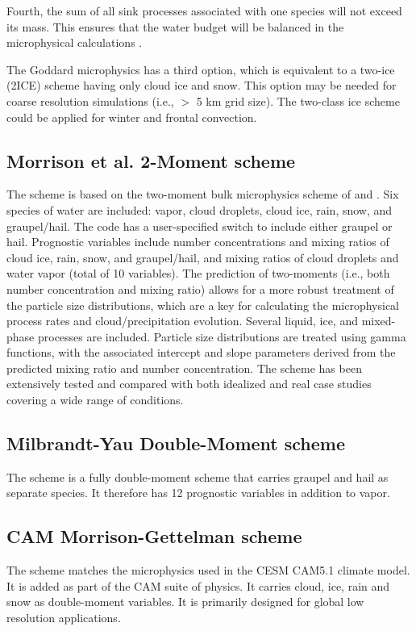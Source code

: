 Fourth, the sum of all sink processes associated with one species will not exceed its mass.  This ensures that the water budget will be balanced in the microphysical calculations .

The Goddard microphysics has a third option, which is equivalent to a two-ice (2ICE) scheme having only cloud ice and snow.  This option may be needed for coarse resolution simulations (i.e., $>$ 5 km grid size).  The two-class ice scheme could be applied for winter and frontal convection.

\subsection {Morrison et al. 2-Moment scheme}

The \citet{morrison08} scheme is based on the two-moment bulk
microphysics scheme of \citet{morrison05} and \citet{morrison06}. Six species of
water are included: vapor, cloud droplets, cloud ice, rain, snow, and
graupel/hail. The code has a user-specified switch to include either graupel or hail. 
Prognostic variables include number concentrations and mixing ratios
of cloud ice, rain, snow, and graupel/hail, and mixing ratios of cloud
droplets and water vapor (total of 10 variables). The prediction of two-moments (i.e., both number concentration and
mixing ratio) allows for a more robust treatment of the particle size
distributions, which are a key for calculating the microphysical process rates
and cloud/precipitation evolution. Several liquid, ice, and mixed-phase
processes are included. Particle size distributions are treated using gamma
functions, with the associated intercept and slope parameters derived from the
predicted mixing ratio and number concentration.
The scheme has been extensively tested and compared with both
idealized and real case studies covering a wide range of conditions.

\subsection {Milbrandt-Yau Double-Moment scheme}
The \citet{milbrandt05} scheme is a fully double-moment scheme that carries graupel and hail as separate species.
It therefore has 12 prognostic variables in addition to vapor.

\subsection {CAM Morrison-Gettelman scheme}
The \citet{morrisongettelman08} scheme matches the microphysics used in the CESM CAM5.1 climate model. It is added as part of the CAM
suite of physics. It carries cloud, ice, rain and snow as double-moment variables. It is primarily designed for global low resolution applications.

